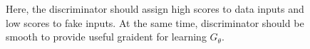 \documentclass[11pt]{article}
\begin{document}
\begin{figure}[H]
    \centering
    \caption*{\centering Here, the discriminator should assign high scores to data inputs and low scores to fake inputs. At the same time, discriminator should be smooth to provide useful graident for learning $G_\theta$.}
\end{figure}
\end{document}
